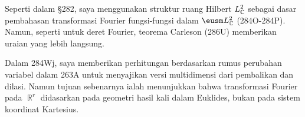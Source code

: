 {Seperti dalam \S282, saya menggunakan struktur ruang Hilbert $L_{\Bbb C}^2$
sebagai dasar pembahasan transformasi Fourier fungsi-fungsi dalam
$\eusm L_{\Bbb C}^2$ (284O-284P). Namun, seperti untuk deret Fourier, teorema
Carleson (286U) memberikan uraian yang lebih langsung.

Dalam 284Wj, saya memberikan perhitungan berdasarkan rumus perubahan variabel
dalam 263A untuk menyajikan versi multidimensi dari pembalikan dan dilasi.
Namun tujuan sebenarnya ialah menunjukkan bahwa transformasi Fourier pada
$\BbbR^r$ didasarkan pada geometri hasil kali dalam Euklides, bukan pada sistem
koordinat Kartesius. }%

\discrpage
